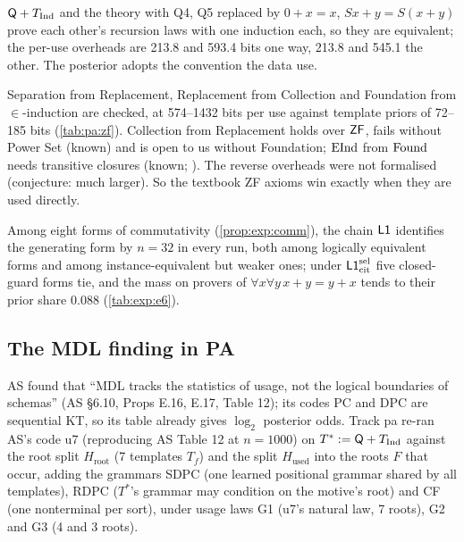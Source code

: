 \begin{proposition}\pabrk{}\label{prop:pa:recursion}
$\mathsf{Q}+T_{\mathrm{Ind}}$ and the theory with Q4, Q5 replaced by $0+x=x$, $Sx+y=S(x+y)$ prove each other's recursion laws with one induction each, so they are equivalent; the per-use overheads are 213.8 and 593.4 bits one way, 213.8 and 545.1 the other. The posterior adopts the convention the data use.
\end{proposition}

\begin{remark}[ZF]\pabrk{}\label{rem:pa:zf}
Separation from Replacement, Replacement from Collection and Foundation from $\in$-induction are checked, at 574--1432 bits per use against template priors of 72--185 bits (\cref{tab:pa:zf}). Collection from Replacement holds over $\mathsf{ZF}$, fails without Power Set \citep{zarach1996replacement,gitman2016zfc} (known) and is open to us without Foundation; $\mathrm{EInd}$ from $\mathrm{Found}$ needs transitive closures (known; \citealp{kaye2007interpretations}). The reverse overheads were not formalised (conjecture: much larger). So the textbook ZF axioms win exactly when they are used directly.
\end{remark}

\begin{remark}[E6: commutativity]\pabrk{}\label{rem:pa:e6}
Among eight forms of commutativity (\cref{prop:exp:comm}), the chain $\mathord{\mathsf{L1}}$ identifies the generating form by $n=32$ in every run, both among logically equivalent forms and among instance-equivalent but weaker ones; under $\mathord{\mathsf{L1}}^{\mathrm{sel}}_{\mathrm{cit}}$ five closed-guard forms tie, and the mass on provers of $\forall x\forall y\,x+y=y+x$ tends to their prior share $0.088$ (\cref{tab:exp:e6}).
\end{remark}

\subsection{The MDL finding in PA}\label{sec:pa:mdl}

AS found that ``MDL tracks the statistics of usage, not the logical boundaries of schemas'' (AS \S6.10, Props E.16, E.17, Table 12); its codes PC and DPC are sequential KT, so its table already gives $\log_2$ posterior odds. Track pa re-ran AS's code u7 (reproducing AS Table 12 at $n=1000$) on $T^*:=\mathsf{Q}+T_{\mathrm{Ind}}$ against the root split $H_{\mathrm{root}}$ (7 templates $T_f$) and the split $H_{\mathrm{used}}$ into the roots $F$ that occur, adding the grammars SDPC (one learned positional grammar shared by all templates), RDPC ($T^*$'s grammar may condition on the motive's root) and CF (one nonterminal per sort), under usage laws G1 (u7's natural law, 7 roots), G2 and G3 (4 and 3 roots).

